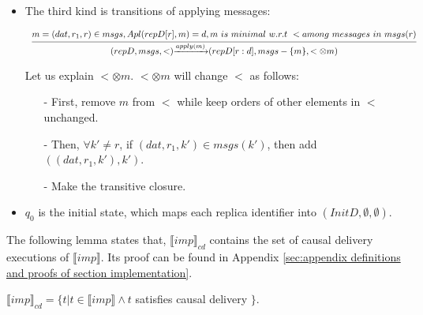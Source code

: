 {\begin {itemize}
    Let us explain $< \otimes dat$. $< \otimes dat$ will change $<$ as follows:

    \begin{itemize}
    \setlength{\itemsep}{0.5pt}
    \item[-] $\forall k' \in RId$, in $msgs(k')$, if $m_1 < r$, then erase $(m_1,r)$, add $(m_1,(dat,r,k'))$,

    \item[-] $\forall k' \in RId$, if $m_2$ is the maximal message among $\{ (\_,r,k') \}$ w.r.t $<$, then add $(m_2,(dat,r,k'))$.

    \item[-] Make the transitive closure.
    \end{itemize}

\item[-] The third kind is transitions of applying messages:

    $\begin{array}{l c} \bigfrac{ m = (dat,r_1,r) \in msgs,Apl(repD[r],m) = d, m \ is \ minimal \ w.r.t \ < among \ messages \ in \ msgs(r) } {(repD,msgs,<) {\xrightarrow{apply(m)}} (repD[r:d],msgs - \{ m \}, < \otimes m )} \end{array}$

    Let us explain $< \otimes m$. $< \otimes m$ will change $<$ as follows:

    \begin{itemize}
    \setlength{\itemsep}{0.5pt}
    \item[-] First, remove $m$ from $<$ while keep orders of other elements in $<$ unchanged.

    \item[-] Then, $\forall k' \neq r$, if $(dat,r_1,k') \in msgs(k')$, then add $((dat,r_1,k'),k')$.

    \item[-] Make the transitive closure.
    \end{itemize}

\item[-] $q_0$ is the initial state, which maps each replica identifier into $(InitD,\emptyset,\emptyset)$.
\end{itemize}

The following lemma states that, $\llbracket imp \rrbracket_{cd}$ contains the set of causal delivery executions of $\llbracket imp \rrbracket$. Its proof can be found in Appendix \ref{sec:appendix definitions and proofs of section implementation}.

\begin{lemma}
\label{lemma:semantics of imp cd contains the set of causal delivery executions of semantics of imp}

$\llbracket imp \rrbracket_{cd} = \{ t \vert t \in \llbracket imp \rrbracket \wedge t$ satisfies causal delivery $\}$.
\end{lemma}
}
